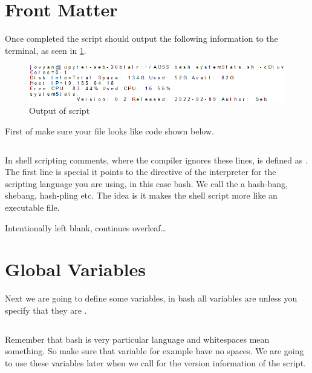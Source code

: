 \documentclass{article}
\begin{document}
\section{Front Matter}
\label{sec:frontMatter}
Once completed the script should output the following information to the terminal, as seen in \cref{fig:outputofscript}.

\begin{figure}[H]
    \centering
    \includegraphics[width=1\textwidth]{images/systemStats_output.PNG}
    \caption{Output of script}
    \label{fig:outputofscript}
\end{figure}

First of make sure your file looks like code shown below.

\inputminted[frame=single,firstline=1, lastline=5,linenos]{bash}{./systemStats.sh}

In shell scripting comments, where the compiler ignores these lines, is defined as \code{\#}. The first line is special it points to the directive of the interpreter for the scripting language you are using, in this case bash. We call the \code{\#!} a hash-bang, shebang, hash-pling etc. The idea is it makes the shell script more like an executable file.

\begin{center}
\vspace{5em}
    Intentionally left blank, continues overleaf\ldots
\end{center}

\section{Global Variables}
\label{sec:globalVariables}
Next we are going to define some  variables, in bash all variables are  unless you specify that they are .

\inputminted[frame=single,firstline=6, lastline=8,linenos]{bash}{./systemStats.sh}

Remember that bash is very particular language and whitespaces mean something.  So make sure that variable for example have no spaces. We are going to use these variables later when we call for the version information of the script.
\end{document}
